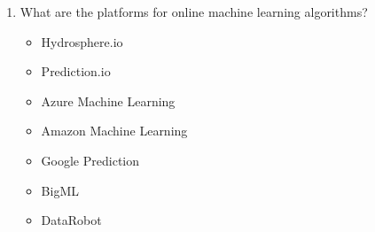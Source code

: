 \documentclass[12pt]{article}
\newenvironment{QandA}{\begin{enumerate}[label=\bfseries\arabic*.]\bfseries}
{\end{enumerate}}
\newenvironment{answered}{\par\normalfont\color{Sepia}}{}
\begin{document}
\begin{QandA}
    \item What are the platforms for online machine learning algorithms?
    \begin{answered}
        \begin{itemize}
            \item Hydrosphere.io
            \item Prediction.io
            \item Azure Machine Learning
            \item Amazon Machine Learning
            \item Google Prediction
            \item BigML
            \item DataRobot
        \end{itemize}
    \end{answered}

\end{QandA}
\end{document}
